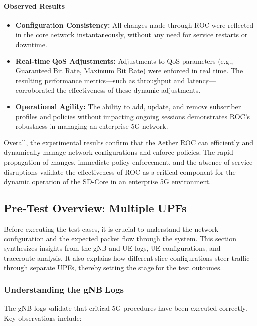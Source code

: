 \paragraph{Observed Results}
\begin{itemize}
    \item \textbf{Configuration Consistency:} All changes made through ROC were reflected in the core network instantaneously, without any need for service restarts or downtime.
    \item \textbf{Real-time QoS Adjustments:} Adjustments to QoS parameters (e.g., Guaranteed Bit Rate, Maximum Bit Rate) were enforced in real time. The resulting performance metrics—such as throughput and latency—corroborated the effectiveness of these dynamic adjustments.
    \item \textbf{Operational Agility:} The ability to add, update, and remove subscriber profiles and policies without impacting ongoing sessions demonstrates ROC’s robustness in managing an enterprise 5G network.
\end{itemize}

Overall, the experimental results confirm that the Aether ROC can efficiently and dynamically manage network configurations and enforce policies. The rapid propagation of changes, immediate policy enforcement, and the absence of service disruptions validate the effectiveness of ROC as a critical component for the dynamic operation of the SD-Core in an enterprise 5G environment.




\subsection{Pre-Test Overview: Multiple UPFs}
\label{sec:pre-test-overview}

Before executing the test cases, it is crucial to understand the network 
configuration and the expected packet flow through the system. This section 
synthesizes insights from the gNB and UE logs, UE configurations, and traceroute 
analysis. It also explains how different slice configurations steer traffic 
through separate UPFs, thereby setting the stage for the test outcomes.

\subsubsection{Understanding the gNB Logs}
\label{subsec:gnb-logs}

The gNB logs validate that critical 5G procedures have been executed correctly. 
Key observations include:


